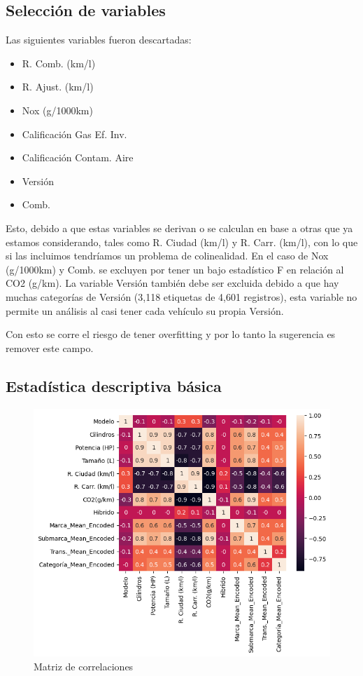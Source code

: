 \documentclass{article}
\begin{document}
\subsection{Selección de variables}

Las siguientes variables fueron descartadas:

\begin{itemize}
    \item R. Comb. (km/l)
    \item R. Ajust. (km/l)
    \item Nox (g/1000km)
    \item Calificación Gas Ef. Inv.
    \item Calificación Contam. Aire
    \item Versión
    \item Comb.
\end{itemize}

Esto, debido a que estas variables se derivan o se calculan en base a otras que ya estamos considerando, tales como R. Ciudad (km/l) y R. Carr. (km/l), con lo que si las incluimos tendríamos un problema de colinealidad. En el caso de Nox (g/1000km) y Comb. se excluyen por tener un bajo estadístico F en relación al CO2 (g/km). La variable Versión también debe ser excluida debido a que hay muchas categorías de Versión (3,118 etiquetas de 4,601 registros), esta variable no permite un análisis al casi tener cada vehículo su propia Versión.

Con esto se corre el riesgo de tener overfitting y por lo tanto la sugerencia es remover este campo.


\subsection{Estadística descriptiva básica}



\newpage

\begin{figure}[h]
  \centering
  \includegraphics[width=1\linewidth]{imagenes/1_correlations.png}
  \caption{Matriz de correlaciones}
  \label{fig:figura1}
\end{figure}
\end{document}

